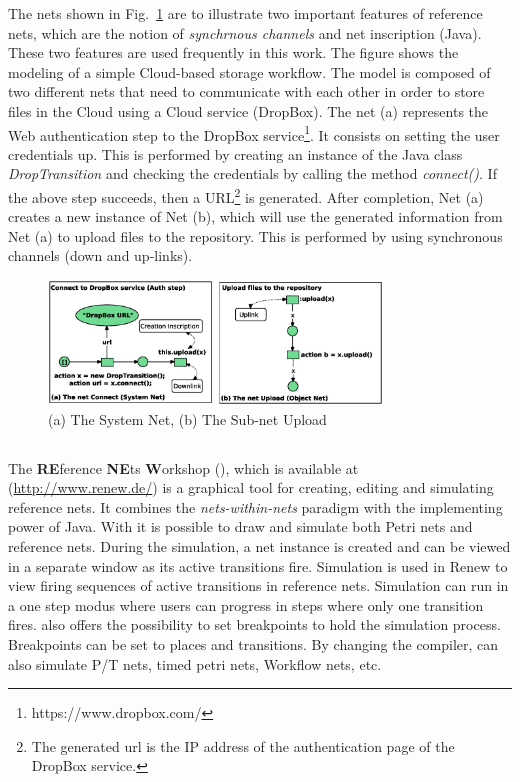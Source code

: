 The nets shown in Fig.~\ref{figure:refnets} are to illustrate two important features of reference nets, which are the notion of \emph{synchrnous channels} and net inscription (Java).
%
These two features are used frequently in this work.
%
The figure shows the modeling of a simple Cloud-based storage workflow.
%
The model is composed of two different nets that need to communicate with each other in order to store files in the Cloud using a Cloud service (DropBox).
%
The net (a) represents the Web authentication step to the DropBox service\footnote{https://www.dropbox.com/}.
%
It consists on setting the user credentials up.
%
This is performed by creating an instance of the Java class \textit{DropTransition} and checking the credentials by calling the method \emph{connect()}.
%
If the above step succeeds, then a URL\footnote{The generated url is the IP address of the authentication page of the DropBox service.} is generated. 
%
After completion, Net (a) creates a new instance of Net (b), which will use the generated information from Net (a) to upload files to the repository.
%
This is performed by using synchronous channels (down and up-links).

\begin{figure}[!t]
 \centering
  \includegraphics[width=0.79\textwidth,height=0.23\textheight]{images/SystemObjectNet}
\caption{(a) The System Net, (b) The Sub-net Upload}
\label{figure:refnets}
\end{figure}





\subsection{\Renew{}}
%
The \textbf{RE}ference \textbf{NE}ts \textbf{W}orkshop (\Renew{}), which is available at (\url{http://www.renew.de/}) is a graphical tool for creating, editing and simulating reference nets.
%
It combines the \textit{nets-within-nets} paradigm with the implementing power of Java.
%
%
%
With \Renew{} it is possible to draw and simulate both Petri nets and reference nets. 
%
%
%
During the simulation, a net instance is created and can be viewed in a separate window as its active transitions fire.
%
Simulation is used in Renew to view firing sequences of active transitions in reference nets.
%
Simulation can run in a one step modus where users can progress in steps where only one transition fires. 
%
\Renew{} also offers the possibility to set breakpoints to hold the simulation process.
%
Breakpoints can be set to places and transitions. 
%
By changing the compiler, \Renew{} can also simulate P/T nets, timed petri nets, Workflow nets, etc.

